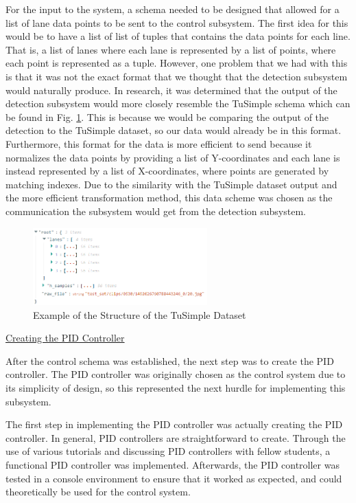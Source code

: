 \documentclass[titlepage]{article}
\begin{document}
{For the input to the system, a schema needed to be designed that allowed for a list of lane data points to be sent to the control subsystem. The first idea for this would be to have a list of list of tuples that contains the data points for each line. That is, a list of lanes where each lane is represented by a list of points, where each point is represented as a tuple. However, one problem that we had with this is that it was not the exact format that we thought that the detection subsystem would naturally produce. In research, it was determined that the output of the detection subsystem would more closely resemble the TuSimple schema which can be found in Fig. \ref{fig:tusimple_dataformat}. This is because we would be comparing the output of the detection to the TuSimple dataset, so our data would already be in this format. Furthermore, this format for the data is more efficient to send because it normalizes the data points by providing a list of Y-coordinates and each lane is instead represented by a list of X-coordinates, where points are generated by matching indexes. Due to the similarity with the TuSimple dataset output and the more efficient transformation method, this data scheme was chosen as the communication the subsystem would get from the detection subsystem.

\begin{figure}
	\centering
	\includegraphics[width=0.6\textwidth]{tusimple_data_example}
	\caption{Example of the Structure of the TuSimple Dataset}
	\label{fig:tusimple_dataformat}
\end{figure}

\underline{Creating the PID Controller}

After the control schema was established, the next step was to create the PID controller. The PID controller was originally chosen as the control system due to its simplicity of design, so this represented the next hurdle for implementing this subsystem.

The first step in implementing the PID controller was actually creating the PID controller. In general, PID controllers are straightforward to create. Through the use of various tutorials and discussing PID controllers with fellow students, a functional PID controller was implemented. Afterwards, the PID controller was tested in a console environment to ensure that it worked as expected, and could theoretically be used for the control system.

}
\end{document}
